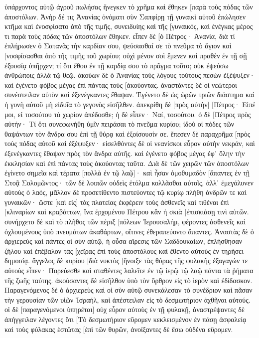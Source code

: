 ὑπάρχοντος αὐτῷ ἀγροῦ πωλήσας ἤνεγκεν τὸ χρῆμα καὶ ἔθηκεν [παρὰ τοὺς πόδας τῶν ἀποστόλων. 
Ἀνὴρ δέ τις Ἁνανίας ὀνόματι σὺν Σαπφίρῃ τῇ γυναικὶ αὐτοῦ ἐπώλησεν κτῆμα 
καὶ ἐνοσφίσατο ἀπὸ τῆς τιμῆς, συνειδυίης καὶ τῆς [γυναικός, καὶ ἐνέγκας μέρος τι παρὰ τοὺς πόδας τῶν ἀποστόλων ἔθηκεν. 
εἶπεν δὲ [ὁ Πέτρος· Ἁνανία, διὰ τί ἐπλήρωσεν ὁ Σατανᾶς τὴν καρδίαν σου, ψεύσασθαί σε τὸ πνεῦμα τὸ ἅγιον καὶ [νοσφίσασθαι ἀπὸ τῆς τιμῆς τοῦ χωρίου; 
οὐχὶ μένον σοὶ ἔμενεν καὶ πραθὲν ἐν τῇ σῇ ἐξουσίᾳ ὑπῆρχεν; τί ὅτι ἔθου ἐν τῇ καρδίᾳ σου τὸ πρᾶγμα τοῦτο; οὐκ ἐψεύσω ἀνθρώποις ἀλλὰ τῷ θεῷ. 
ἀκούων δὲ ὁ Ἁνανίας τοὺς λόγους τούτους πεσὼν ἐξέψυξεν· καὶ ἐγένετο φόβος μέγας ἐπὶ πάντας τοὺς [ἀκούοντας. 
ἀναστάντες δὲ οἱ νεώτεροι συνέστειλαν αὐτὸν καὶ ἐξενέγκαντες ἔθαψαν. 
Ἐγένετο δὲ ὡς ὡρῶν τριῶν διάστημα καὶ ἡ γυνὴ αὐτοῦ μὴ εἰδυῖα τὸ γεγονὸς εἰσῆλθεν. 
ἀπεκρίθη δὲ [πρὸς αὐτὴν] [Πέτρος· Εἰπέ μοι, εἰ τοσούτου τὸ χωρίον ἀπέδοσθε; ἡ δὲ εἶπεν· Ναί, τοσούτου. 
ὁ δὲ [Πέτρος πρὸς αὐτήν· Τί ὅτι συνεφωνήθη ὑμῖν πειράσαι τὸ πνεῦμα κυρίου; ἰδοὺ οἱ πόδες τῶν θαψάντων τὸν ἄνδρα σου ἐπὶ τῇ θύρᾳ καὶ ἐξοίσουσίν σε. 
ἔπεσεν δὲ παραχρῆμα [πρὸς τοὺς πόδας αὐτοῦ καὶ ἐξέψυξεν· εἰσελθόντες δὲ οἱ νεανίσκοι εὗρον αὐτὴν νεκράν, καὶ ἐξενέγκαντες ἔθαψαν πρὸς τὸν ἄνδρα αὐτῆς. 
καὶ ἐγένετο φόβος μέγας ἐφ᾽ ὅλην τὴν ἐκκλησίαν καὶ ἐπὶ πάντας τοὺς ἀκούοντας ταῦτα. 
Διὰ δὲ τῶν χειρῶν τῶν ἀποστόλων ἐγίνετο σημεῖα καὶ τέρατα [πολλὰ ἐν τῷ λαῷ]· καὶ ἦσαν ὁμοθυμαδὸν [ἅπαντες ἐν τῇ Στοᾷ Σολομῶντος· 
τῶν δὲ λοιπῶν οὐδεὶς ἐτόλμα κολλᾶσθαι αὐτοῖς, ἀλλ᾽ ἐμεγάλυνεν αὐτοὺς ὁ λαός, 
μᾶλλον δὲ προσετίθεντο πιστεύοντες τῷ κυρίῳ πλήθη ἀνδρῶν τε καὶ γυναικῶν· 
ὥστε [καὶ εἰς] τὰς πλατείας ἐκφέρειν τοὺς ἀσθενεῖς καὶ τιθέναι ἐπὶ [κλιναρίων καὶ κραβάττων, ἵνα ἐρχομένου Πέτρου κἂν ἡ σκιὰ [ἐπισκιάσῃ τινὶ αὐτῶν. 
συνήρχετο δὲ καὶ τὸ πλῆθος τῶν πέριξ [πόλεων Ἰερουσαλήμ, φέροντες ἀσθενεῖς καὶ ὀχλουμένους ὑπὸ πνευμάτων ἀκαθάρτων, οἵτινες ἐθεραπεύοντο ἅπαντες. 
Ἀναστὰς δὲ ὁ ἀρχιερεὺς καὶ πάντες οἱ σὺν αὐτῷ, ἡ οὖσα αἵρεσις τῶν Σαδδουκαίων, ἐπλήσθησαν ζήλου 
καὶ ἐπέβαλον τὰς [χεῖρας ἐπὶ τοὺς ἀποστόλους καὶ ἔθεντο αὐτοὺς ἐν τηρήσει δημοσίᾳ. 
ἄγγελος δὲ κυρίου [διὰ νυκτὸς [ἤνοιξε τὰς θύρας τῆς φυλακῆς ἐξαγαγών τε αὐτοὺς εἶπεν· 
Πορεύεσθε καὶ σταθέντες λαλεῖτε ἐν τῷ ἱερῷ τῷ λαῷ πάντα τὰ ῥήματα τῆς ζωῆς ταύτης. 
ἀκούσαντες δὲ εἰσῆλθον ὑπὸ τὸν ὄρθρον εἰς τὸ ἱερὸν καὶ ἐδίδασκον. Παραγενόμενος δὲ ὁ ἀρχιερεὺς καὶ οἱ σὺν αὐτῷ συνεκάλεσαν τὸ συνέδριον καὶ πᾶσαν τὴν γερουσίαν τῶν υἱῶν Ἰσραήλ, καὶ ἀπέστειλαν εἰς τὸ δεσμωτήριον ἀχθῆναι αὐτούς. 
οἱ δὲ [παραγενόμενοι ὑπηρέται] οὐχ εὗρον αὐτοὺς ἐν τῇ φυλακῇ, ἀναστρέψαντες δὲ ἀπήγγειλαν 
λέγοντες ὅτι [Τὸ δεσμωτήριον εὕρομεν κεκλεισμένον ἐν πάσῃ ἀσφαλείᾳ καὶ τοὺς φύλακας ἑστῶτας [ἐπὶ τῶν θυρῶν, ἀνοίξαντες δὲ ἔσω οὐδένα εὕρομεν. 
